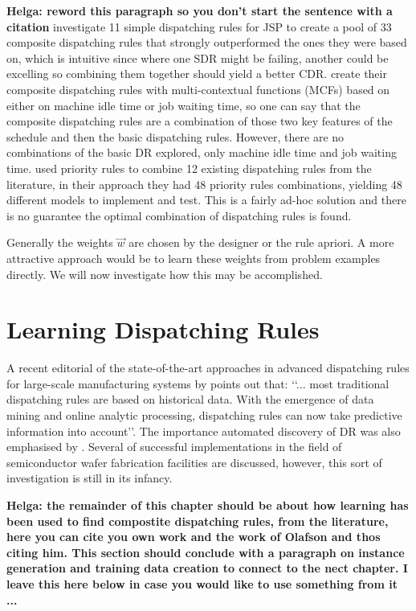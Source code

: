 \documentclass[smallextended]{svjour3}
\begin{document}
{\bf Helga: reword this paragraph so you don't start the sentence with a citation}
\citet{Lu13} investigate 11 simple dispatching rules for JSP to create
a pool of 33 composite dispatching rules that strongly outperformed
the ones they were based on, which is intuitive since where one SDR
might be failing, another could be excelling so combining them
together should yield a better CDR. \citet{Lu13} create their
composite dispatching rules with multi-contextual functions (MCFs)
based on either on machine idle time or job waiting time, so one can
say that the composite dispatching rules are a combination of those
two key features of the schedule and then the basic dispatching
rules. However, there are no combinations of the basic DR explored,
only machine idle time and job waiting time.  \citet{Yu13} used
priority rules to combine 12 existing dispatching rules from the
literature, in their approach they had 48 priority rules combinations,
yielding 48 different models to implement and test. This is a fairly
ad-hoc solution and there is no guarantee the optimal combination of
dispatching rules is found.

	
Generally the weights $\vec{w}$ are chosen by the designer or the rule
apriori.  A more attractive approach would be to learn these weights from problem examples directly. We will now investigate how this may be accomplished.

\section{Learning Dispatching Rules}\label{ch:learningmodels}
	

	
A recent editorial of the state-of-the-art approaches in advanced
dispatching rules for large-scale manufacturing systems by
\citet{Chen13} points out that:
\lq\lq ... most traditional dispatching rules are based on historical
  data. With the emergence of data mining and online analytic
  processing, dispatching rules can now take predictive information
  into account\rq\rq. The importance automated discovery of DR was also emphasised by \cite{Monch13}. 
Several of successful implementations in the field of
semiconductor wafer fabrication facilities are discussed, however, this sort of
investigation is still in its infancy.

{\bf Helga: the remainder of this chapter should be about how learning has been used to find compostite dispatching rules, from the literature, here you can cite you own work and the work of Olafson and thos citing him. This section should conclude with a paragraph on instance generation and training data creation to connect to the nect chapter. I leave this here below in case you would like to use something from it ...}
\end{document}
